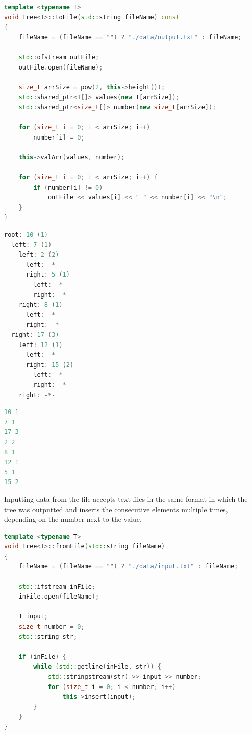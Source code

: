 \documentclass[12pt]{article}
\begin{document}
\begin{footnotesize}
\begin{lstlisting}[language=C++]
template <typename T>
void Tree<T>::toFile(std::string fileName) const
{
    fileName = (fileName == "") ? "./data/output.txt" : fileName;

    std::ofstream outFile;
    outFile.open(fileName);

    size_t arrSize = pow(2, this->height());
    std::shared_ptr<T[]> values(new T[arrSize]);
    std::shared_ptr<size_t[]> number(new size_t[arrSize]);

    for (size_t i = 0; i < arrSize; i++)
        number[i] = 0;

    this->valArr(values, number);

    for (size_t i = 0; i < arrSize; i++) {
        if (number[i] != 0)
            outFile << values[i] << " " << number[i] << "\n";
    }
}
\end{lstlisting}
\end{footnotesize}

\begin{footnotesize}
\begin{lstlisting}[language=C++, caption=Tree shown during program runtime]
root: 10 (1)
  left: 7 (1)
    left: 2 (2)
      left: -*-
      right: 5 (1)
        left: -*-
        right: -*-
    right: 8 (1)
      left: -*-
      right: -*-
  right: 17 (3)
    left: 12 (1)
      left: -*-
      right: 15 (2)
        left: -*-
        right: -*-
    right: -*-
\end{lstlisting}
\end{footnotesize}
\pagebreak
\begin{footnotesize}
\begin{lstlisting}[language=C++, caption=Serialized tree]
10 1
7 1
17 3
2 2
8 1
12 1
5 1
15 2
\end{lstlisting}
\end{footnotesize}

Inputting data from the file accepts text files in the same format in which the tree was outputted and inserts the consecutive elements multiple times, depending on the number next to the value. 

\begin{footnotesize}
\begin{lstlisting}[language=C++]
template <typename T>
void Tree<T>::fromFile(std::string fileName)
{
    fileName = (fileName == "") ? "./data/input.txt" : fileName;

    std::ifstream inFile;
    inFile.open(fileName);

    T input;
    size_t number = 0;
    std::string str;

    if (inFile) {
        while (std::getline(inFile, str)) {
            std::stringstream(str) >> input >> number;
            for (size_t i = 0; i < number; i++)
                this->insert(input);
        }
    }
}
\end{lstlisting}
\end{footnotesize}
\end{document}
